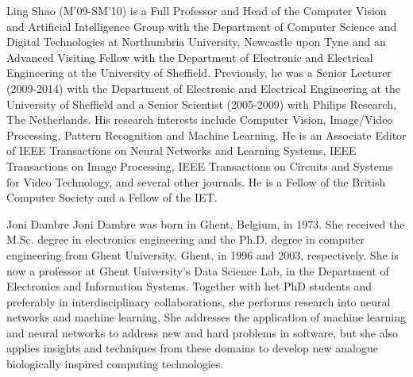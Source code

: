 \begin{IEEEbiography}{Ling Shao}
(M'09-SM'10) is a Full Professor and Head of the Computer Vision and Artificial Intelligence Group with the Department of Computer Science and Digital Technologies at Northumbria University, Newcastle upon Tyne and an Advanced Visiting Fellow with the Department of Electronic and Electrical Engineering at the University of Sheffield. Previously, he was a Senior Lecturer (2009-2014) with the Department of Electronic and Electrical Engineering at the University of Sheffield and a Senior Scientist (2005-2009) with Philips Research, The Netherlands. His research interests include Computer Vision, Image/Video Processing, Pattern Recognition and Machine Learning. He is an Associate Editor of IEEE Transactions on Neural Networks and Learning Systems, IEEE Transactions on Image Processing, IEEE Transactions on Circuits and Systems for Video Technology, and several other journals.  He is a Fellow of the British Computer Society and a Fellow of the IET.
\end{IEEEbiography}


\begin{IEEEbiography}{Joni Dambre}
Joni Dambre was born in Ghent, Belgium, in 1973. She received the M.Sc. degree in electronics engineering and the Ph.D. degree in computer engineering from Ghent University, Ghent, in 1996 and 2003, respectively. She is now a professor at Ghent University's Data Science Lab, in the Department of Electronics and Information Systems. Together with het PhD students and preferably in interdisciplinary collaborations, she performs research into neural networks and machine learning. She addresses the application of machine learning and neural networks to address new and hard problems in software, but she also applies insights and techniques from these domains to develop new analogue biologically inspired computing technologies.
\end{IEEEbiography}

